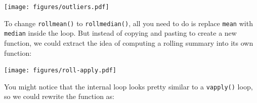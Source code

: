 \begin{Shaded}
\begin{Highlighting}[]
\StringTok{ }\NormalTok{(}\NormalTok{, }\NormalTok{, } \NormalTok{) +}\StringTok{ }\NormalTok{(}\NormalTok{, } \NormalTok{) /}\StringTok{ }
\NormalTok{(}\NormalTok{), } \NormalTok{, } \NormalTok{)}
\end{Highlighting}
\end{Shaded}

\texttt{[image: figures/outliers.pdf]}

To change \texttt{rollmean()} to \texttt{rollmedian()}, all you need to
do is replace \texttt{mean} with \texttt{median} inside the loop. But
instead of copying and pasting to create a new function, we could
extract the idea of computing a rolling summary into its own function:

\begin{Shaded}
\begin{Highlighting}[]
\StringTok{ }
  \StringTok{ }\NormalTok{(}\NormalTok{, }

  \StringTok{ }\StringTok{ }\NormalTok{)}
  \StringTok{ }\NormalTok{):(}\StringTok{ }\StringTok{ }\StringTok{ }\NormalTok{)) \{}
    \StringTok{ }\NormalTok{(x[(i -}\StringTok{ }\StringTok{ }\NormalTok{offset)], ...)}
  \NormalTok{\}}
\NormalTok{\}}
\NormalTok{(} \NormalTok{, } \NormalTok{)}
\end{Highlighting}
\end{Shaded}

\texttt{[image: figures/roll-apply.pdf]}

You might notice that the internal loop looks pretty similar to a
\texttt{vapply()} loop, so we could rewrite the function as:

